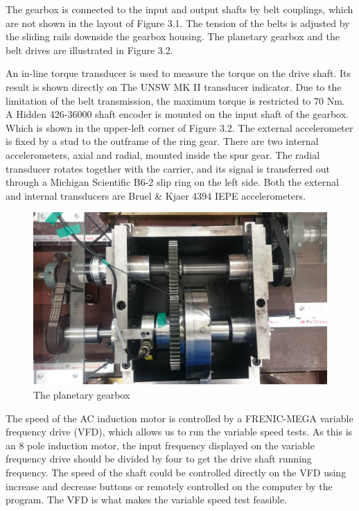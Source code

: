 The gearbox is connected to the input and output shafts by belt couplings, which are not shown in the layout of Figure 3.1. The tension of the belts is adjusted by the sliding rails downside the gearbox housing. The planetary gearbox and the belt drives are illustrated in Figure 3.2.

An in-line torque transducer is used to measure the torque on the drive shaft. Its result is shown directly on The UNSW MK II transducer indicator. Due to the limitation of the belt transmission, the maximum torque is restricted to 70 Nm.
A Hidden 426-36000 shaft encoder is mounted on the input shaft of the gearbox. Which is shown in the upper-left corner of Figure 3.2. 
The external accelerometer is fixed by a stud to the outframe of the ring gear. There are two internal accelerometers, axial and radial, mounted inside the spur gear. The radial transducer rotates together with the carrier, and its signal is transferred out through a Michigan Scientific B6-2 slip ring on the left side. Both the external and internal transducers are Bruel \& Kjaer 4394 IEPE accelerometers.

\begin{figure}[h]
	\centering
	\includegraphics[scale = 0.7]{gearbox}
	\caption{The planetary gearbox}
	\label{gearbox}
\end{figure}

The speed of the AC induction motor is controlled by a FRENIC-MEGA variable frequency drive (VFD), which allows us to run the variable speed tests. As this is an 8 pole induction motor, the input frequency displayed on the variable frequency drive should be divided by four to get the drive shaft running frequency. The speed of the shaft could be controlled directly on the VFD using increase and decrease buttons or remotely controlled on the computer by the program. The VFD is what makes the variable speed test feasible.

